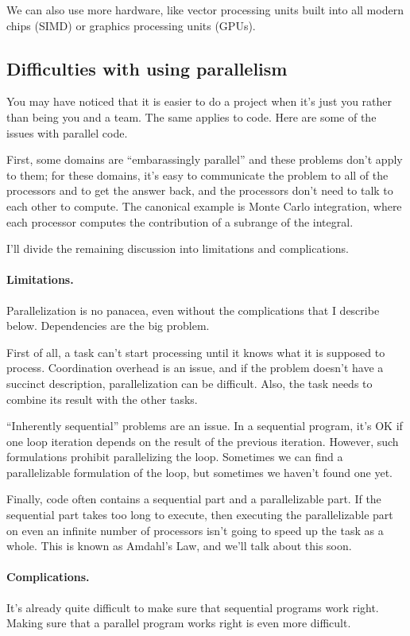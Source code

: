 \documentclass[a4paper]{report}
\begin{document}
We can also use more hardware, like vector processing units built into all modern
chips (SIMD) or graphics processing units (GPUs).

\subsection*{Difficulties with using parallelism}
You may have noticed that it is easier to do a project when it's just
you rather than being you and a team. The same applies to code.
Here are some of the issues with parallel code.

First, some domains are ``embarassingly parallel'' and these problems
don't apply to them; for these domains, it's easy to communicate
the problem to all of the processors and to get the answer back, and
the processors don't need to talk to each other to compute. The canonical
example is Monte Carlo integration, where each processor computes the
contribution of a subrange of the integral.

I'll divide the remaining discussion into limitations and complications.

\paragraph{Limitations.} Parallelization is no panacea, even without
the complications that I describe below. Dependencies are the
big problem.

First of all, a task can't start processing until it knows what it
is supposed to process. Coordination overhead is an issue, and if the
problem doesn't have a succinct description, parallelization can be
difficult. Also, the task needs to combine its result with the other
tasks.

``Inherently sequential'' problems are an issue. In a sequential 
program, it's OK if one loop iteration depends on the result of the
previous iteration. However, such formulations prohibit parallelizing
the loop. Sometimes we can find a parallelizable formulation of the loop,
but sometimes we haven't found one yet.

Finally, code often contains a sequential part and a parallelizable
part.  If the sequential part takes too long to execute, then
executing the parallelizable part on even an infinite number of
processors isn't going to speed up the task as a whole. This is
known as Amdahl's Law, and we'll talk about this soon.

\paragraph{Complications.} It's already quite difficult to make sure that
sequential programs work right. Making sure that a parallel program
works right is even more difficult.
\end{document}
